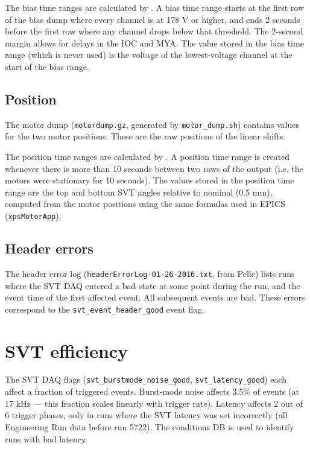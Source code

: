 \documentclass[aps,amsmath,amssymb,notitlepage,10pt,onecolumn]{revtex4-1}
\begin{document}
The bias time ranges are calculated by .
A bias time range starts at the first row of the bias dump where every channel is at 178 V or higher, and ends 2 seconds before the first row where any channel drops below that threshold.
The 2-second margin allows for delays in the IOC and MYA.
The value stored in the bias time range (which is never used) is the voltage of the lowest-voltage channel at the start of the bias range.

\subsection{Position}
The motor dump (\texttt{motordump.gz}, generated by \texttt{motor\_dump.sh}) contains values for the two motor positions.
These are the raw positions of the linear shifts.

The position time ranges are calculated by .
A position time range is created whenever there is more than 10 seconds between two rows of the output (i.e. the motors were stationary for 10 seconds).
The values stored in the position time range are the top and bottom SVT angles relative to nominal (0.5 mm), computed from the motor positions using the same formulas used in EPICS (\texttt{xpsMotorApp}).

\subsection{Header errors}
The header error log (\texttt{headerErrorLog-01-26-2016.txt}, from Pelle) lists runs where the SVT DAQ entered a bad state at some point during the run, and the event time of the first affected event.
All subsequent events are bad.
These errors correspond to the \texttt{svt\_event\_header\_good} event flag.

\section{SVT efficiency}
The SVT DAQ flags (\texttt{svt\_burstmode\_noise\_good}, \texttt{svt\_latency\_good}) each affect a fraction of triggered events. Burst-mode noise affects 3.5\% of events (at 17 kHz --- this fraction scales linearly with trigger rate).
Latency affects 2 out of 6 trigger phases, only in runs where the SVT latency was set incorrectly (all Engineering Run data before run 5722). The conditions DB is used to identify runs with bad latency.
\end{document}
